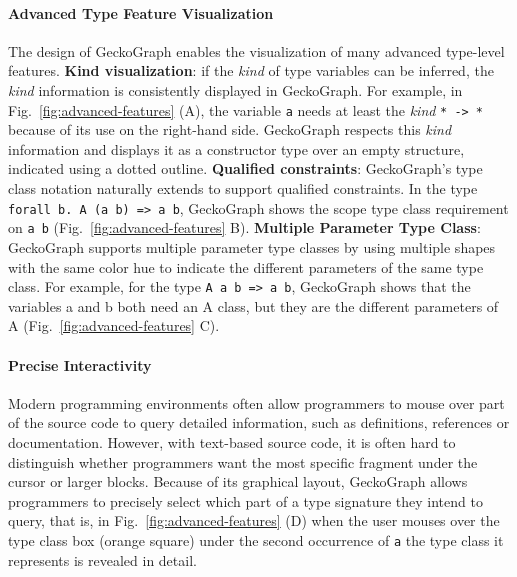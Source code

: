\paragraph{Advanced Type Feature Visualization}
The design of GeckoGraph enables the visualization of many advanced type-level features. \textbf{Kind visualization}: if the \textit{kind} of type variables can be inferred, the \textit{kind} information is consistently displayed in GeckoGraph. For example, in Fig.~\ref{fig:advanced-features} (A), the variable \texttt{a} needs at least the \textit{kind} \texttt{* -> *} because of its use on the right-hand side. GeckoGraph respects this \textit{kind} information and displays it as a constructor type over an empty structure, indicated using a dotted outline.  \textbf{Qualified constraints}: GeckoGraph's type class notation naturally extends to support qualified constraints. In the type \texttt{forall b. A (a b) => a b}, GeckoGraph shows the scope type class requirement on \texttt{a b} (Fig.~\ref{fig:advanced-features} B).
\textbf{Multiple Parameter Type Class}:  GeckoGraph supports multiple parameter type classes by using multiple shapes with the same color hue to indicate the different parameters of the same type class.  For example, for the type \texttt{A a b => a b},  GeckoGraph shows that the variables a and b both need an A class, but they are the different parameters of A (Fig.~\ref{fig:advanced-features} C).

\paragraph{Precise Interactivity}
Modern programming environments often allow programmers to mouse over part of the source code to query detailed information, such as definitions, references or documentation. However, with text-based source code, it is often hard to distinguish whether programmers want the most specific fragment under the cursor or larger blocks. Because of its graphical layout, GeckoGraph allows programmers to precisely select which part of a type signature they intend to query, that is, in Fig.~\ref{fig:advanced-features} (D) when the user mouses over the type class box (orange square) under the second occurrence of \texttt{a} the type class it represents is revealed in detail. 

